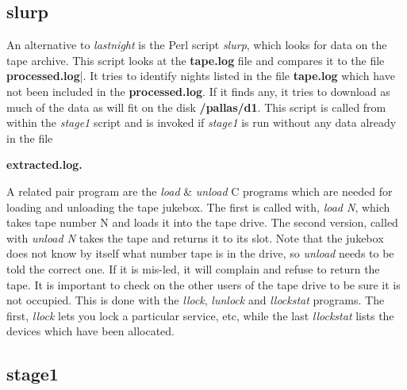 \documentclass{article}
\newcommand\pr{\em}                   %
\newcommand\ff{\bf}                   %
\begin{document}
\subsection{slurp}

An alternative to {\pr lastnight} is the Perl script {\pr slurp},
which looks for data on the tape archive.  This script looks at the
{\ff tape.log} file and compares it to the file {\ff processed.log}|.
It tries to identify nights listed in the file {\ff tape.log} which
have not been included in the {\ff processed.log}.  If it finds any,
it tries to download as much of the data as will fit on the disk {\ff
/pallas/d1}.  This script is called from within the {\pr stage1}
script and is invoked if {\pr stage1} is run without any data already
in the file {\ff extracted.log.

A related pair program are the {\pr load} \& {\pr unload} C programs
which are needed for loading and unloading the tape jukebox.  The
first is called with, {\pr load N}, which takes tape number N and
loads it into the tape drive.  The second version, called with {\pr
unload N} takes the tape and returns it to its slot.  Note that the
jukebox does not know by itself what number tape is in the drive, so
{\pr unload} needs to be told the correct one.  If it is mis-led, it
will complain and refuse to return the tape.  It is important to check
on the other users of the tape drive to be sure it is not occupied.
This is done with the {\pr llock}, {\pr lunlock} and {\pr llockstat}
programs.  The first, {\pr llock} lets you lock a particular service,
etc, while the last {\pr llockstat} lists the devices which have been
allocated.

\subsection{stage1}

}
\end{document}

